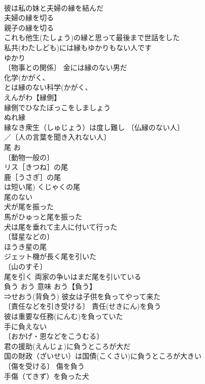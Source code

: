 \documentclass[8pt]{extreport}
\begin{document}
\begin{CJK}{UTF8}{min}
\\	彼は私の妹と夫婦の縁を結んだ 
\\	夫婦の縁を切る 
\\	親子の縁を切る 
\\	これも他生(たしょう)の縁と思って最後まで世話をした 
\\	私共(わたしども)には縁もゆかりもない人です 
\\	ゆかり 
\\	〔物事との関係〕 金には縁のない男だ 
\\	化学(かがく、
\\	とは縁のない科学(かがく、
\\	えんがわ【縁側】　
\\	縁側でひなたぼっこをしましょう 
\\	ぬれ縁 
\\	縁なき衆生（しゅじょう）は度し難し 〔仏縁のない人〕
\\	／〔人の言葉を聞き入れない人〕
\\	尾	お	
\\	〔動物一般の〕
\\	リス［きつね］の尾 
\\	鹿［うさぎ］の尾 
\\	は短い尾) くじゃくの尾 
\\	尾のない 
\\	犬が尾を振った 
\\	馬がひゅっと尾を振った 
\\	犬は尾を垂れて主人に付いて行った 
\\	〔彗星などの〕
\\	ほうき星の尾 
\\	ジェット機が長く尾を引いた 
\\	〔山のすそ〕
\\	尾を引く 両家の争いはまだ尾を引いている 
\\	負う	おう	意味 おう【負う】 
\\	⇒せおう(背負う) 彼女は子供を負ってやって来た 
\\	〔責任などを引き受ける〕 責任(せきにん)を負う 
\\	彼は重要な任務(にんむ)を負っていた 
\\	手に負えない 
\\	〔おかげ・恩などをこうむる〕
\\	君の援助(えんじょ)に負うところが大だ 
\\	国の財政（ざいせい）は国債(こくさい)に負うところが大きい 
\\	〔傷を受ける〕 傷を負う 
\\	手傷（てきず）を負った犬 

\end{CJK}
\end{document}
